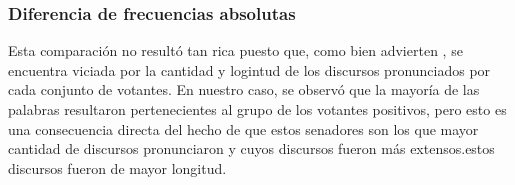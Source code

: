 \subsubsection{Diferencia de frecuencias absolutas}
Esta comparación no resultó tan rica puesto que, como bien advierten
\cite{monroe2008fightin}, se encuentra viciada por la cantidad y logintud
de los discursos pronunciados por cada conjunto de votantes. En nuestro caso,
se observó que la mayoría de las palabras resultaron pertenecientes al grupo
de los votantes positivos, pero esto es una consecuencia directa del hecho
de que estos senadores son los que mayor cantidad de discursos pronunciaron y
cuyos discursos fueron más extensos.estos discursos fueron de mayor 
longitud.
